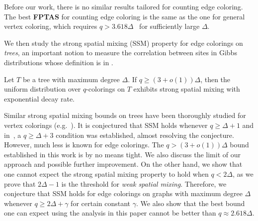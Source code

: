 Before our work, there is no similar results tailored for counting edge coloring. The best \textbf{FPTAS} for counting edge coloring is the same as the one for general vertex coloring, which requires $q>3.618\Delta$~\cite{CV25,CFGZZ24} for sufficiently large $\Delta$.

We then study the strong spatial mixing (SSM) property for edge colorings on \emph{trees}, an important notion to measure the correlation between sites in Gibbs distributions whose definition is in .


\begin{theorem}[Informal]\label{thm:SSM-informal}
    Let $T$ be a tree with maximum degree $\Delta$. If $q\geq (3+o(1))\Delta$, then the uniform distribution over $q$-colorings on $T$ exhibits strong spatial mixing with exponential decay rate.
\end{theorem}

Similar strong spatial mixing bounds on trees have been thoroughly studied for vertex colorings (e.g.~\cite{EGHSV19,CLMM23}). It is conjectured that SSM holds whenever $q\ge \Delta+1$ and in~\cite{CLMM23}, a $q\ge \Delta+3$ condition was established, almost resolving the conjecture. However, much less is known for edge colorings. 
The $q>(3+o(1))\Delta$ bound established in this work is by no means tight. We also discuss the limit of our approach and possible further improvement. On the other hand, we show that one cannot expect the strong spatial mixing property to hold when $q<2\Delta$, as we prove that $2\Delta-1$ is the threshold for \emph{weak spatial mixing}. Therefore, we conjecture that SSM holds for edge colorings on graphs with maximum degree $\Delta$ whenever $q\ge 2\Delta+\gamma$ for certain constant $\gamma$. We also show that the best bound one can expect using the analysis in this paper cannot be better than $q\approx 2.618\Delta$.

